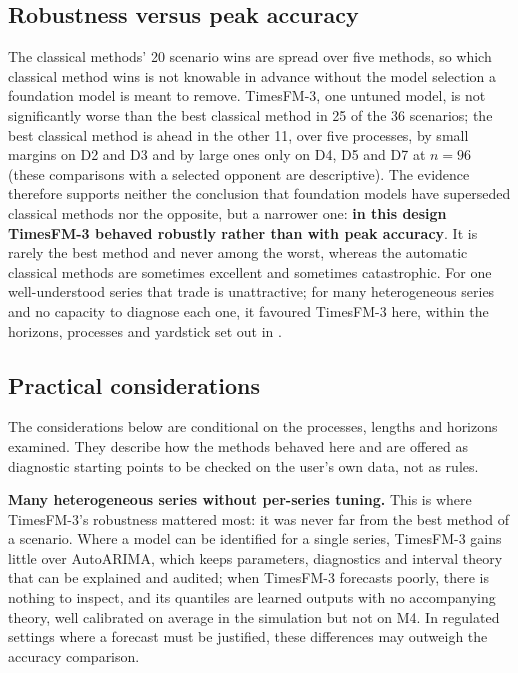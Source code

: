 \subsection{Robustness versus peak accuracy}
\label{sec:tradeoff}

The classical methods' 20 scenario wins are spread over five methods, so which classical method wins is not
knowable in advance without the model selection a foundation model is meant to remove. TimesFM-3, one
untuned model, is not significantly worse than the best classical method in 25 of the 36 scenarios; the best
classical method is ahead in the other 11, over five processes, by small margins on D2 and D3 and by large
ones only on D4, D5 and D7 at $n = 96$ (these comparisons with a selected opponent are descriptive). The
evidence therefore supports neither the conclusion that foundation models have superseded classical methods
nor the opposite, but a narrower one: \textbf{in this design TimesFM-3 behaved robustly rather than with peak
accuracy}. It is rarely the best method and never among the worst, whereas the automatic classical methods
are sometimes excellent and sometimes catastrophic. For one well-understood series that trade is
unattractive; for many heterogeneous series and no capacity to diagnose each one, it favoured TimesFM-3 here,
within the horizons, processes and yardstick set out in .

\subsection{Practical considerations}
\label{sec:practical}

The considerations below are conditional on the processes, lengths and horizons examined. They describe how
the methods behaved here and are offered as diagnostic starting points to be checked on the user's own
data, not as rules.

\textbf{Many heterogeneous series without per-series tuning.} This is where TimesFM-3's robustness mattered
most: it was never far from the best method of a scenario. Where a model can be identified for a single series,
TimesFM-3 gains little over AutoARIMA, which keeps parameters, diagnostics and interval theory that
can be explained and audited; when TimesFM-3 forecasts poorly, there is nothing to inspect, and its quantiles
are learned outputs with no accompanying theory, well calibrated on average in the simulation but not on M4.
In regulated settings where a forecast must be justified, these differences may outweigh the accuracy
comparison.

